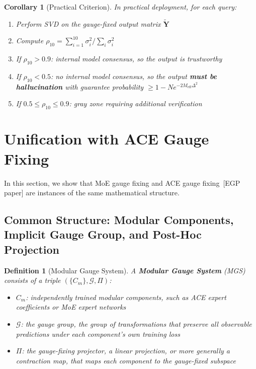 \documentclass[12pt,a4paper]{article}
\newtheorem{corollary}[theorem]{Corollary}
\newtheorem{definition}[theorem]{Definition}
\theoremstyle{remark}
\newcommand{\G}{\mathcal{G}}
\begin{document}
\begin{corollary}[Practical Criterion]\label{cor:practical}
In practical deployment, for each query:
\begin{enumerate}[label=(\roman*)]
    \item Perform SVD on the gauge-fixed output matrix $\tilde{\mathbf{Y}}$
    \item Compute $\rho_{10} = \sum_{i=1}^{10} \sigma_i^2 / \sum_i \sigma_i^2$
    \item If $\rho_{10} > 0.9$: internal model consensus, so the output is trustworthy
    \item If $\rho_{10} < 0.5$: no internal model consensus, so the output \textbf{must be hallucination} with guarantee probability $\geq 1 - N e^{-2M_{\text{eff}}\Delta^2}$
    \item If $0.5 \leq \rho_{10} \leq 0.9$: gray zone requiring additional verification
\end{enumerate}
\end{corollary}

\section{Unification with ACE Gauge Fixing}

In this section, we show that MoE gauge fixing and ACE gauge fixing~[EGP paper] are instances of the same mathematical structure.

\subsection{Common Structure: Modular Components, Implicit Gauge Group, and Post-Hoc Projection}

\begin{definition}[Modular Gauge System]\label{def:modular_gauge}
A \textbf{Modular Gauge System} (MGS) consists of a triple $(\{C_m\}, \G, \Pi)$:
\begin{itemize}
    \item $C_m$: independently trained modular components, such as ACE expert coefficients or MoE expert networks
    \item $\G$: the gauge group, the group of transformations that preserve all observable predictions under each component's own training loss
    \item $\Pi$: the gauge-fixing projector, a linear projection, or more generally a contraction map, that maps each component to the gauge-fixed subspace
\end{itemize}
\end{definition}
\end{document}
